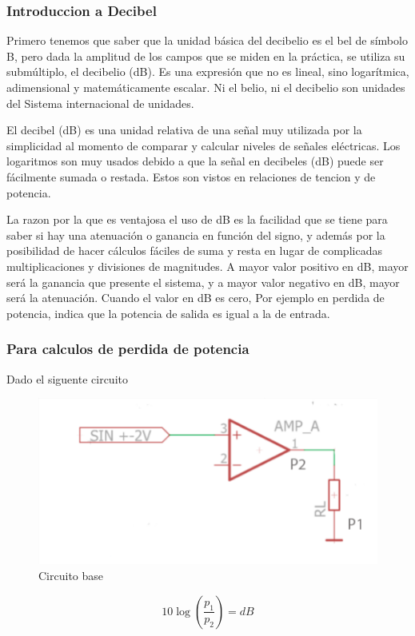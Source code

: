 \documentclass[../main.tex]{subfiles}
\begin{document}
		\subsubsection{Introduccion a Decibel}
		Primero tenemos que saber que la unidad básica del decibelio es el  bel de 
		símbolo B, pero dada la amplitud de los campos que se miden en la práctica, 
		se utiliza su submúltiplo, el decibelio (dB). Es una expresión que no es 
		lineal, sino logarítmica, adimensional y matemáticamente escalar. Ni el 
		belio, ni el decibelio son unidades del Sistema internacional de unidades.

		El decibel (dB) es una unidad relativa de una señal muy utilizada por la 
		simplicidad al momento de comparar y calcular niveles de señales eléctricas. Los 
		logaritmos son muy usados debido a que la señal en decibeles (dB) puede ser 
		fácilmente sumada o restada. Estos son vistos en relaciones de tencion y de potencia. 

		La razon por la que es ventajosa el uso de dB es  la facilidad que se tiene para 
		saber si hay una atenuación o ganancia en función del signo, y además por la 
		posibilidad de hacer cálculos fáciles de suma y resta en lugar de complicadas 
		multiplicaciones y divisiones de magnitudes. A mayor valor positivo en dB, mayor 
		será la ganancia que presente el sistema, y a mayor valor negativo en dB, mayor 
		será la atenuación. Cuando el valor en dB es cero, Por ejemplo en perdida de 
		potencia, indica que la potencia de salida es igual a la de entrada.

		\subsubsection{Para calculos de perdida de potencia}
		Dado el siguente circuito
		\begin{figure}[H]
			\includegraphics[width=\textwidth]{imagen15.png}
			\centering
			\caption{Circuito base}
		\end{figure}
		\[
			10\log\left(\dfrac{p_{1}}{p_{2}}\right)=dB
		\]
\end{document}
